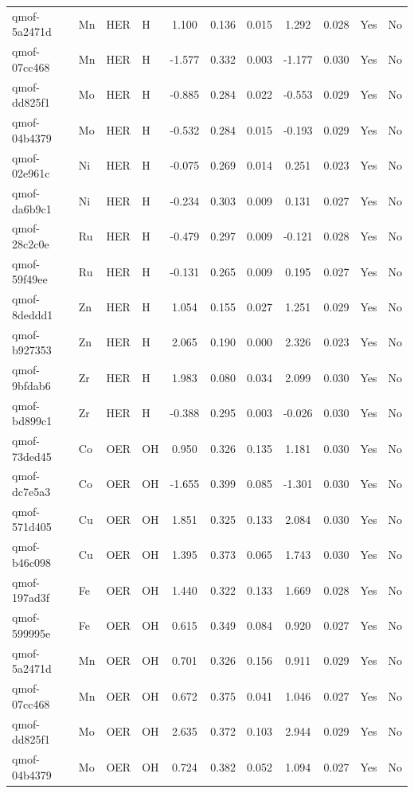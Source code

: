 {\begin{longtable}{llllccccccc}
qmof-5a2471d & Mn & HER & H & 1.100 & 0.136 & 0.015 & 1.292 & 0.028 & Yes & No \\
qmof-07cc468 & Mn & HER & H & -1.577 & 0.332 & 0.003 & -1.177 & 0.030 & Yes & No \\
qmof-dd825f1 & Mo & HER & H & -0.885 & 0.284 & 0.022 & -0.553 & 0.029 & Yes & No \\
qmof-04b4379 & Mo & HER & H & -0.532 & 0.284 & 0.015 & -0.193 & 0.029 & Yes & No \\
qmof-02e961c & Ni & HER & H & -0.075 & 0.269 & 0.014 & 0.251 & 0.023 & Yes & No \\
qmof-da6b9c1 & Ni & HER & H & -0.234 & 0.303 & 0.009 & 0.131 & 0.027 & Yes & No \\
qmof-28c2c0e & Ru & HER & H & -0.479 & 0.297 & 0.009 & -0.121 & 0.028 & Yes & No \\
qmof-59f49ee & Ru & HER & H & -0.131 & 0.265 & 0.009 & 0.195 & 0.027 & Yes & No \\
qmof-8deddd1 & Zn & HER & H & 1.054 & 0.155 & 0.027 & 1.251 & 0.029 & Yes & No \\
qmof-b927353 & Zn & HER & H & 2.065 & 0.190 & 0.000 & 2.326 & 0.023 & Yes & No \\
qmof-9bfdab6 & Zr & HER & H & 1.983 & 0.080 & 0.034 & 2.099 & 0.030 & Yes & No \\
qmof-bd899c1 & Zr & HER & H & -0.388 & 0.295 & 0.003 & -0.026 & 0.030 & Yes & No \\
qmof-73ded45 & Co & OER & OH & 0.950 & 0.326 & 0.135 & 1.181 & 0.030 & Yes & No \\
qmof-dc7e5a3 & Co & OER & OH & -1.655 & 0.399 & 0.085 & -1.301 & 0.030 & Yes & No \\
qmof-571d405 & Cu & OER & OH & 1.851 & 0.325 & 0.133 & 2.084 & 0.030 & Yes & No \\
qmof-b46c098 & Cu & OER & OH & 1.395 & 0.373 & 0.065 & 1.743 & 0.030 & Yes & No \\
qmof-197ad3f & Fe & OER & OH & 1.440 & 0.322 & 0.133 & 1.669 & 0.028 & Yes & No \\
qmof-599995e & Fe & OER & OH & 0.615 & 0.349 & 0.084 & 0.920 & 0.027 & Yes & No \\
qmof-5a2471d & Mn & OER & OH & 0.701 & 0.326 & 0.156 & 0.911 & 0.029 & Yes & No \\
qmof-07cc468 & Mn & OER & OH & 0.672 & 0.375 & 0.041 & 1.046 & 0.027 & Yes & No \\
qmof-dd825f1 & Mo & OER & OH & 2.635 & 0.372 & 0.103 & 2.944 & 0.029 & Yes & No \\
qmof-04b4379 & Mo & OER & OH & 0.724 & 0.382 & 0.052 & 1.094 & 0.027 & Yes & No \\

\end{longtable}}
